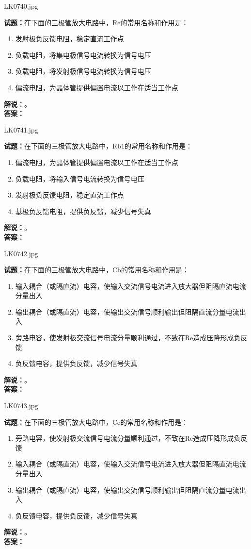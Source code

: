 \documentclass{ctexbook}
\begin{document}
\bigskip

LK0740.jpg


\noindent\textbf{试题：}在下面的三极管放大电路中，Re的常用名称和作用是：
\begin{enumerate}[leftmargin=3em]
\item 发射极负反馈电阻，稳定直流工作点
\item 负载电阻，将集电极信号电流转换为信号电压
\item 负载电阻，将发射极信号电流转换为信号电压
\item 偏流电阻，为晶体管提供偏置电流以工作在适当工作点
\end{enumerate}
\noindent\textbf{解说：}\textbf{}。\\\noindent\textbf{答案：}

\bigskip

LK0741.jpg


\noindent\textbf{试题：}在下面的三极管放大电路中，Rb1的常用名称和作用是：
\begin{enumerate}[leftmargin=3em]
\item 偏流电阻，为晶体管提供偏置电流以工作在适当工作点
\item 负载电阻，将输入信号电流转换为信号电压
\item 发射极负反馈电阻，稳定直流工作点
\item 基极负反馈电阻，提供负反馈，减少信号失真
\end{enumerate}
\noindent\textbf{解说：}\textbf{}。\\\noindent\textbf{答案：}

\bigskip

LK0742.jpg


\noindent\textbf{试题：}在下面的三极管放大电路中，Cb的常用名称和作用是：
\begin{enumerate}[leftmargin=3em]
\item 输入耦合（或隔直流）电容，使输入交流信号电流进入放大器但阻隔直流电流分量出入
\item 输出耦合（或隔直流）电容，使输出交流信号顺利输出但阻隔直流分量电流出入
\item 旁路电容，使发射极交流信号电流分量顺利通过，不致在Re造成压降形成负反馈
\item 负反馈电容，提供负反馈，减少信号失真
\end{enumerate}
\noindent\textbf{解说：}\textbf{}。\\\noindent\textbf{答案：}

\bigskip

LK0743.jpg


\noindent\textbf{试题：}在下面的三极管放大电路中，Ce的常用名称和作用是：
\begin{enumerate}[leftmargin=3em]
\item 旁路电容，使发射极交流信号电流分量顺利通过，不致在Re造成压降形成负反馈
\item 输入耦合（或隔直流）电容，使输入交流信号电流进入放大器但阻隔直流电流分量出入
\item 输出耦合（或隔直流）电容，使输出交流信号顺利输出但阻隔直流分量电流出入
\item 负反馈电容，提供负反馈，减少信号失真
\end{enumerate}
\noindent\textbf{解说：}\textbf{}。\\\noindent\textbf{答案：}
\end{document}
